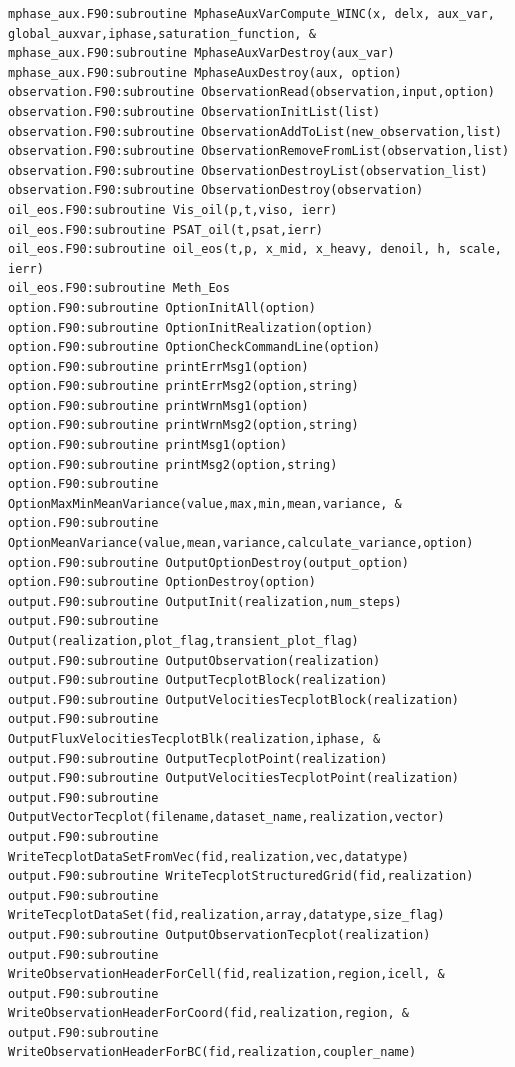 \documentclass[12pt]{article}
\begin{document}
\begin{verbatim}
mphase_aux.F90:subroutine MphaseAuxVarCompute_WINC(x, delx, aux_var, global_auxvar,iphase,saturation_function, &
mphase_aux.F90:subroutine MphaseAuxVarDestroy(aux_var)
mphase_aux.F90:subroutine MphaseAuxDestroy(aux, option)
observation.F90:subroutine ObservationRead(observation,input,option)
observation.F90:subroutine ObservationInitList(list)
observation.F90:subroutine ObservationAddToList(new_observation,list)
observation.F90:subroutine ObservationRemoveFromList(observation,list)
observation.F90:subroutine ObservationDestroyList(observation_list)
observation.F90:subroutine ObservationDestroy(observation)
oil_eos.F90:subroutine Vis_oil(p,t,viso, ierr)
oil_eos.F90:subroutine PSAT_oil(t,psat,ierr)
oil_eos.F90:subroutine oil_eos(t,p, x_mid, x_heavy, denoil, h, scale, ierr)
oil_eos.F90:subroutine Meth_Eos
option.F90:subroutine OptionInitAll(option)
option.F90:subroutine OptionInitRealization(option)
option.F90:subroutine OptionCheckCommandLine(option)
option.F90:subroutine printErrMsg1(option)
option.F90:subroutine printErrMsg2(option,string)
option.F90:subroutine printWrnMsg1(option)
option.F90:subroutine printWrnMsg2(option,string)
option.F90:subroutine printMsg1(option)
option.F90:subroutine printMsg2(option,string)
option.F90:subroutine OptionMaxMinMeanVariance(value,max,min,mean,variance, &
option.F90:subroutine OptionMeanVariance(value,mean,variance,calculate_variance,option)
option.F90:subroutine OutputOptionDestroy(output_option)
option.F90:subroutine OptionDestroy(option)
output.F90:subroutine OutputInit(realization,num_steps)
output.F90:subroutine Output(realization,plot_flag,transient_plot_flag)
output.F90:subroutine OutputObservation(realization)
output.F90:subroutine OutputTecplotBlock(realization)
output.F90:subroutine OutputVelocitiesTecplotBlock(realization)
output.F90:subroutine OutputFluxVelocitiesTecplotBlk(realization,iphase, &
output.F90:subroutine OutputTecplotPoint(realization)
output.F90:subroutine OutputVelocitiesTecplotPoint(realization)
output.F90:subroutine OutputVectorTecplot(filename,dataset_name,realization,vector)
output.F90:subroutine WriteTecplotDataSetFromVec(fid,realization,vec,datatype)
output.F90:subroutine WriteTecplotStructuredGrid(fid,realization)
output.F90:subroutine WriteTecplotDataSet(fid,realization,array,datatype,size_flag)
output.F90:subroutine OutputObservationTecplot(realization)
output.F90:subroutine WriteObservationHeaderForCell(fid,realization,region,icell, &
output.F90:subroutine WriteObservationHeaderForCoord(fid,realization,region, &
output.F90:subroutine WriteObservationHeaderForBC(fid,realization,coupler_name)

\end{verbatim}
\end{document}

